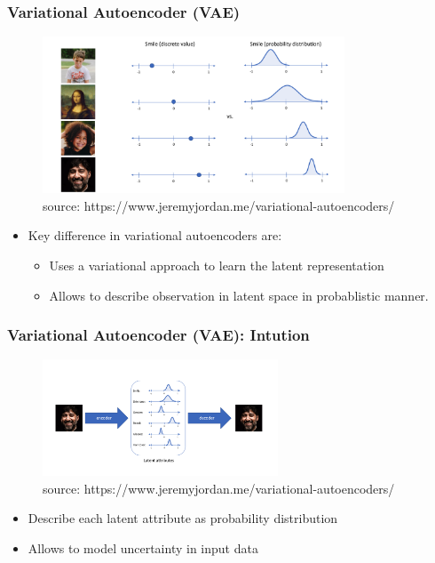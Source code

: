 \begin{frame}
\frametitle{Variational Autoencoder (VAE)}

                \begin{figure}
                \centering
                \includegraphics[width=9cm]{plots/vae_motivation.png}
                \vspace{-6pt}
                \caption{\tiny{source: https://www.jeremyjordan.me/variational-autoencoders/}}
                \end{figure}
                \vspace{-10pt}

\begin{itemize}
\item Key difference in variational autoencoders are:
  \begin{itemize}
    \item Uses a variational approach to learn the latent representation
    \item Allows to describe observation in latent space in probablistic manner.
  \end{itemize}     
\end{itemize}  

\end{frame}


\begin{frame}
\frametitle{Variational Autoencoder (VAE): Intution}

                \begin{figure}
                \centering
                \includegraphics[width=7cm]{plots/vae_intution.png}
                \vspace{-8pt}
                \caption{\tiny{source: https://www.jeremyjordan.me/variational-autoencoders/}}
                \end{figure}


\begin{itemize}
\item Describe each latent attribute as probability distribution
\item Allows to model uncertainty in input data
\end{itemize}

\end{frame}

